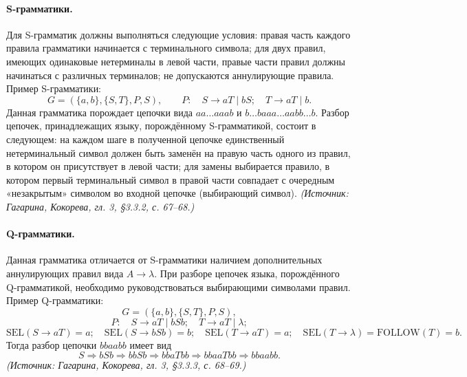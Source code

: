 \documentclass[a4paper,12pt]{article}
\begin{document}
\paragraph{S-грамматики.}
Для S-грамматик должны выполняться следующие условия: правая часть каждого правила грамматики начинается с терминального символа; для двух правил, имеющих одинаковые нетерминалы в левой части, правые части правил должны начинаться с различных терминалов; не допускаются аннулирующие правила. Пример S-грамматики:
\[
G=(\{a,b\},\{S,T\},P,S),\qquad
P:\quad S\to aT\mid bS;\quad T\to aT\mid b.
\]
Данная грамматика порождает цепочки вида \(aa\ldots aaab\) и \(b\ldots baaa\ldots aabb\ldots b\). Разбор цепочек, принадлежащих языку, порождённому S-грамматикой, состоит в следующем: на каждом шаге в полученной цепочке единственный нетерминальный символ должен быть заменён на правую часть одного из правил, в котором он присутствует в левой части; для замены выбирается правило, в котором первый терминальный символ в правой части совпадает с очередным «незакрытым» символом во входной цепочке (выбирающий символ).
\textit{(Источник: Гагарина, Кокорева, гл. 3, §3.3.2, с. 67--68.)}

\paragraph{Q-грамматики.}
Данная грамматика отличается от S-грамматики наличием дополнительных аннулирующих правил вида \(A\to\lambda\). При разборе цепочек языка, порождённого Q-грамматикой, необходимо руководствоваться выбирающими символами правил. Пример Q-грамматики:
\[
G=(\{a,b\},\{S,T\},P,S),
\]
\[
P:\quad S\to aT\mid bSb;\quad T\to aT\mid\lambda;
\]
\[
\mathrm{SEL}(S\to aT)=a;\quad \mathrm{SEL}(S\to bSb)=b;\quad \mathrm{SEL}(T\to aT)=a;\quad \mathrm{SEL}(T\to\lambda)=\mathrm{FOLLOW}(T)=b.
\]
Тогда разбор цепочки \(bbaabb\) имеет вид
\[
S\Rightarrow bSb\Rightarrow bbSb\Rightarrow bbaTbb\Rightarrow bbaaTbb\Rightarrow bbaabb.
\]
\textit{(Источник: Гагарина, Кокорева, гл. 3, §3.3.3, с. 68--69.)}
\end{document}
